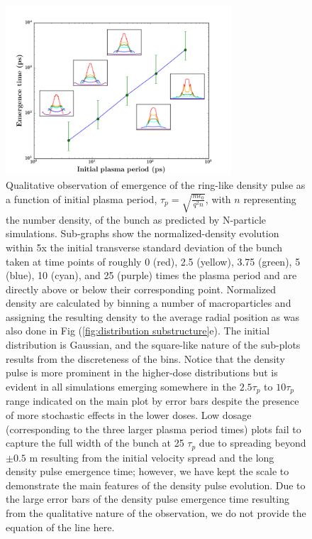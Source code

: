 \documentclass[aps,prl,twocolumn,showpacs,superscriptaddress,groupedaddress]{revtex4-1}  %
\begin{document}
{\begin{figure}
  \centering
   \includegraphics[width=0.75\textwidth]{figures/emergence_time.png}
\caption{\label{fig:emergence time vs plasma period} Qualitative observation of emergence of the ring-like density pulse 
as a function of initial plasma period, $\tau_p = \sqrt{\frac{m \epsilon_0}{q^2 n}}$, with $n$ representing the number density,
of the bunch as predicted by N-particle simulations.  Sub-graphs show the normalized-density evolution within 5x the initial transverse standard 
deviation of the bunch
taken at time points of roughly 0 (red), 2.5 (yellow), 3.75 (green), 5 (blue), 10 (cyan), and 25 (purple) times the plasma period
and are directly above or below their corresponding point. 
Normalized density are calculated by 
binning a number of macroparticles and assigning the resulting density to the average radial position as was also done in
Fig (\ref{fig:distribution substructure}e).  The 
initial distribution is Gaussian, and the square-like nature of the sub-plots results from the discreteness of the bins.   
Notice that the density pulse is more prominent in the higher-dose distributions but is evident in all simulations emerging
somewhere in the $2.5 \tau_p$ to $10 \tau_p$ range indicated on the main plot by error bars despite the presence
of more stochastic effects in the lower doses.  Low dosage (corresponding to the three larger
plasma period times) plots fail to capture the full width of
the bunch at 25 $\tau_p$ due to spreading beyond $\pm 0.5$ m resulting from the initial velocity spread and the long density pulse
emergence time; however, we have kept the scale to demonstrate the main features of the density pulse evolution. Due to the 
large error bars of the density pulse emergence time resulting from the qualitative nature of the observation, 
we do not provide the equation of the line here.  
}
\end{figure} 

}
\end{document}
